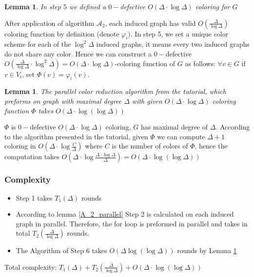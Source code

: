 \documentclass[11pt]{article}
\newtheorem{lemma}[theorem]{Lemma}
\begin{document}
\begin{lemma}
In step $5$ we defined a $0-$defective $O(\Delta \cdot \log{\Delta})$ coloring for $G$
\end{lemma}
After application of algorithm $\mathcal{A}_2$, each induced graph has valid $O(\frac{\Delta}{\log{\Delta}})$ coloring function by definition (denote $\varphi_i)$. In step 5, we set a unique color scheme for each of the $\log^2{\Delta}$ induced graphs, it means every two induced graphs do not share any color. Hence we can construct a  $0-$defective $O(\frac{\Delta}{\log{\Delta}}  \cdot  \log^2{\Delta})
=O(\Delta  \cdot  \log{\Delta})$-coloring function of $G$ as follows: $\forall v \in G$ if $v \in V_i$, set $\Phi(v) = \varphi_i(v)$. 
\begin{lemma}
\label{parallel_reduction_tutorial}
The parallel color reduction algorithm from the tutorial, which preforms on graph with maximal degree $\Delta$ with given $O(\Delta  \cdot  \log{\Delta})$ coloring function $\Phi$ takes $O(\Delta  \cdot  \log({\log{\Delta}}))$
\end{lemma}
$\Phi$ is $0-$defective $O(\Delta \cdot \log{\Delta})$ coloring, $G$ has maximal degree of $\Delta$. According to the algorithm presented in the tutorial, given $\Phi$ we can compute $\Delta+1$ coloring in 
$O(\Delta  \cdot  \log{\frac{C}{\Delta}})$ where $C$ is the number of colors of $\Phi$, hence the computation takes $O(\Delta  \cdot  \log{\frac{\Delta \cdot \log{\Delta}}{\Delta}})=O(\Delta  \cdot  \log({\log{\Delta}}))
$


\subsubsection*{Complexity}
\begin{itemize}
    \item Step 1 takes $T_1(\Delta)$ rounds
    \item According to lemma \ref{A_2_parallel} Step 2 is calculated on each induced graph in parallel. Therefore, the for loop is preformed in parallel and takes in total $T_2(\frac{\Delta}{\log{\Delta}})$ rounds. 
    \item The Algorithm of Step 6 takes $O(\Delta\log(\log{{\Delta}}))$ rounds by Lemma \ref{parallel_reduction_tutorial}
\end{itemize}

Total complexity: $T_1(\Delta) + T_2(\frac{\Delta}{\log{\Delta}}) + O(\Delta  \cdot  \log({\log{\Delta}}))$ 
\end{document}
